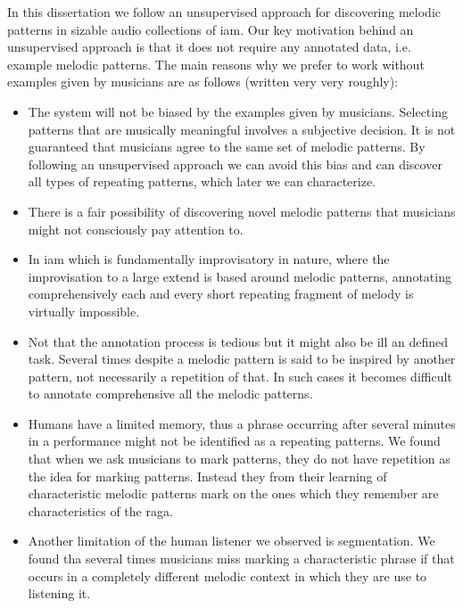 In this dissertation we follow an unsupervised approach for discovering melodic patterns in sizable audio collections of \gls{iam}. Our key motivation behind an unsupervised approach is that it does not require any annotated data, i.e. example melodic patterns. The main reasons why we prefer to work without examples given by musicians are as follows (written very very roughly): 
\begin{itemize}
	\item The system will not be biased by the examples given by musicians. Selecting patterns that are musically meaningful involves a subjective decision. It is not guaranteed that musicians agree to the same set of melodic patterns. By following an unsupervised approach we can avoid this bias and can discover all types of repeating patterns, which later we can characterize.
	\item There is a fair possibility of discovering novel melodic patterns that musicians might not consciously pay attention to. 
	\item In \gls{iam} which is fundamentally improvisatory in nature, where the improvisation to a large extend is based around melodic patterns, annotating comprehensively each and every short repeating fragment of melody is virtually impossible.
	\item Not that the annotation process is tedious but it might also be ill an defined task. Several times despite a melodic pattern is said to be inspired by another pattern, not necessarily a repetition of that. In such cases it becomes difficult to annotate comprehensive all the melodic patterns. 
	\item Humans have a limited memory, thus a phrase occurring after several minutes in a performance might not be identified as a repeating patterns. We found that when we ask musicians to mark patterns, they do not have repetition as the idea for marking patterns. Instead they from their learning of characteristic melodic patterns mark on the ones which they remember are characteristics of the \gls{raga}.
	\item Another limitation of the  human listener we observed is segmentation. We found tha several times musicians miss marking a characteristic phrase if that occurs in a completely different melodic context in which they are use to listening it.  
\end{itemize}


